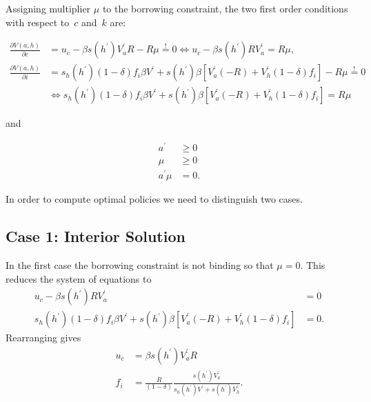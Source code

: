 \documentclass[a4paper,12pt]{article}
\begin{document}
Assigning multiplier $\mu$ to the borrowing constraint, the two first order conditions with respect to~$c$ and~$k$ are:

\begin{align}
	\frac{\partial V\left(a,h\right)} {\partial c}  &  = u_{c} - \beta s\left(h^{\prime}\right) V_{a}^{\prime} R - R \mu \overset{!}{=}0 \Leftrightarrow u_{c} - \beta s\left(h^{\prime}\right) R V_{a}^{\prime} = R \mu,  \label{FOC1} \\
	\frac{\partial V\left(a,h\right)} {\partial i}  &  = s_{h}\left(h^{\prime}\right) \left(1 - \delta\right) f_{i} \beta V^{\prime} + s\left(h^{\prime}\right) \beta \left[V_{a}^{\prime} \left(-R\right) + V_{h}^{\prime} \left(1 - \delta\right) f_{i}\right] - R\mu \overset{!}{=}0  \nonumber \\
	&  \Leftrightarrow s_{h}\left(h^{\prime}\right) \left(1 - \delta\right) f_{i} \beta V^{\prime} + s\left(h^{\prime}\right) \beta \left[V_{a}^{\prime} \left(-R\right) + V_{h}^{\prime} \left(1 - \delta\right) f_{i}\right] = R \mu  \label{FOC2}
\end{align}

and

\begin{align*}
	a^{\prime}     & \geq0  \\
	\mu            & \geq0  \\
	a^{\prime} \mu & =0.
\end{align*}

In order to compute optimal policies we need to distinguish two cases.

\subsection*{Case 1: Interior Solution}

In the first case the borrowing constraint is not binding so that $\mu = 0$. This reduces the system of equations to
\begin{align*}
	u_{c} - \beta s\left(h^{\prime}\right) R V_{a}^{\prime}  &  = 0  \\
	s_{h}\left(h^{\prime}\right) \left(1 - \delta\right) f_{i} \beta V^{\prime} + s\left(h^{\prime}\right) \beta \left[V_{a}^{\prime} \left(-R\right) + V_{h}^{\prime}\left(1 - \delta\right) f_{i}\right]  &  = 0.
\end{align*}
Rearranging gives
\begin{align*}
	u_{c}  &  = \beta s\left(h^{\prime}\right) V_{a}^{\prime} R  \\
	f_{i}  &  = \frac{R}{\left(1 - \delta\right)} \frac{s\left(h^{\prime}\right) V_{a}^{\prime}} {s_{h} \left(h^{\prime}\right) V^{\prime} + s\left(h^{\prime}\right) V_{h}^{\prime}}.
\end{align*}
\end{document}
